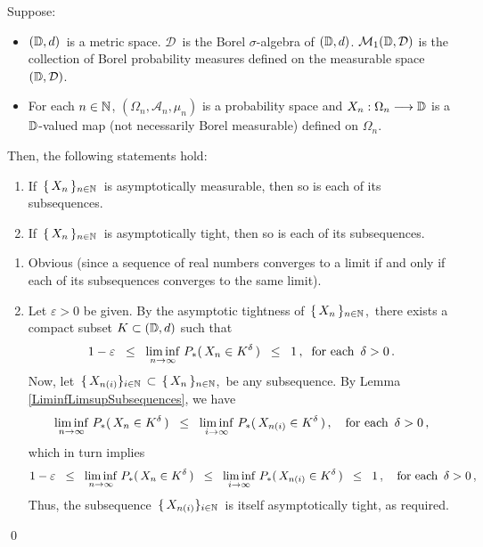 \begin{proposition}
\label{SubsequencesInheritAsymptoticMeasurabilityAndTightness}
\mbox{}\vskip 0.1cm
\noindent
Suppose:
\begin{itemize}
\item
	$(\mathbb{D},d)$\, is a metric space.
	$\mathcal{D}$\, is the Borel $\sigma$-algebra of $(\mathbb{D},d)$.
	\vskip 0.0cm
	$\mathcal{M}_{1}(\mathbb{D},\mathcal{D})$ is the collection of Borel probability measures
	defined on the measurable space $(\mathbb{D},\mathcal{D})$.
\item
	For each $n \in \mathbb{N}$,
	$(\Omega_{n},\mathcal{A}_{n},\mu_{n})$ is a probability space and
	$X_{n} : \Omega_{n} \longrightarrow \mathbb{D}$
	is a $\mathbb{D}$-valued map (not necessarily Borel measurable) defined on $\Omega_{n}$.
\end{itemize}
Then, the following statements hold:
\begin{enumerate}
\item
	If \,$\{\,X_{n}\,\}_{n\in\mathbb{N}}$\, is asymptotically measurable, then so is each of its subsequences.
\item
	If \,$\{\,X_{n}\,\}_{n\in\mathbb{N}}$\, is asymptotically tight, then so is each of its subsequences.
\end{enumerate}
\end{proposition}
\proof
\begin{enumerate}
\item
	Obvious (since a sequence of real numbers converges to a limit if and only if
	each of its subsequences converges to the same limit).
\item
	Let $\varepsilon > 0$ be given.
	By the asymptotic tightness of \,$\{\,X_{n}\,\}_{n\in\mathbb{N}}$,\,
	there exists a compact subset $K \subset (\mathbb{D},d)$ such that
	\begin{equation*}
	1 - \varepsilon
	\;\; \leq \;\; \underset{n\rightarrow\infty}{\liminf}\; P_{*}(\,X_{n} \in K^{\delta}\,)
	\;\; \leq \;\; 1\,,
	\;\;
	\textnormal{for each \,$\delta > 0$}\,.
	\end{equation*}
	Now, let 
	\,$\{\,X_{n(i)}\}_{i\in\mathbb{N}} \,\subset\, \{\,X_{n}\,\}_{n\in\mathbb{N}}$,\,
	be any subsequence.
	By Lemma \ref{LiminfLimsupSubsequences}, we have
	\begin{equation*}
	\underset{n\rightarrow\infty}{\liminf}\; P_{*}(\,X_{n} \in K^{\delta}\,)
	\;\; \leq \;\;
		\underset{i\rightarrow\infty}{\liminf}\; P_{*}(\,X_{n(i)} \in K^{\delta}\,)\,,
	\quad
	\textnormal{for each \,$\delta > 0$}\,,
	\end{equation*}
	which in turn implies
	\begin{equation*}
	1 - \varepsilon
	\;\; \leq \;\;
		\underset{n\rightarrow\infty}{\liminf}\; P_{*}(\,X_{n} \in K^{\delta}\,)
	\;\; \leq \;\;
		\underset{i\rightarrow\infty}{\liminf}\; P_{*}(\,X_{n(i)} \in K^{\delta}\,)
	\;\; \leq \;\;
		1\,,
	\quad
	\textnormal{for each \,$\delta > 0$}\,,
	\end{equation*}
	Thus, the subsequence \,$\{\,X_{n(i)}\}_{i\in\mathbb{N}}$\, is itself asymptotically tight, as required.
\end{enumerate}
\qed

